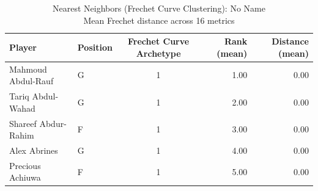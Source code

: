 \begin{table}[t]
\caption*{
{\fontsize{20}{25} Nearest Neighbors (Frechet Curve Clustering): No Name\fontsize{12}{15}\selectfont } \\ 
{\fontsize{14}{17}\selectfont  Mean Frechet distance across 16 metrics\fontsize{12}{15}\selectfont }
} 
\fontsize{12.0pt}{14.0pt}\selectfont
\begin{tabular*}{\linewidth}{@{\extracolsep{\fill}}llcrr}
\toprule
Player & Position & Frechet Curve Archetype & Rank (mean) & Distance (mean) \\ 
\midrule\addlinespace[2.5pt]
Mahmoud Abdul-Rauf & G & 1 & 1.00 & 0.00 \\ 
Tariq Abdul-Wahad & G & 1 & 2.00 & 0.00 \\ 
Shareef Abdur-Rahim & F & 1 & 3.00 & 0.00 \\ 
Alex Abrines & G & 1 & 4.00 & 0.00 \\ 
Precious Achiuwa & F & 1 & 5.00 & 0.00 \\ 
\bottomrule
\end{tabular*}
\end{table}

